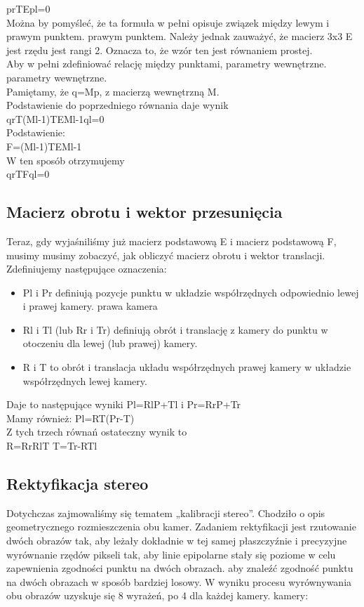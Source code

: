 \documentclass[magisterska]{pracadypl}
\begin{document}
prTEpl=0\\
Można by pomyśleć, że ta formuła w pełni opisuje związek między lewym i prawym punktem.
prawym punktem. Należy jednak zauważyć, że macierz 3x3 E jest rzędu
jest rangi 2. Oznacza to, że wzór ten jest równaniem prostej.\\
Aby w pełni zdefiniować relację między punktami, parametry wewnętrzne.
parametry wewnętrzne.\\
Pamiętamy, że q=Mp, z macierzą wewnętrzną M.\\
Podstawienie do poprzedniego równania daje wynik\\
qrT(Ml-1)TEMl-1ql=0\\
Podstawienie:\\
F=(Ml-1)TEMl-1\\
W ten sposób otrzymujemy\\
qrTFql=0\\

\subsection{Macierz obrotu i wektor przesunięcia}

Teraz, gdy wyjaśniliśmy już macierz podstawową E i macierz podstawową F, musimy
musimy zobaczyć, jak obliczyć macierz obrotu i wektor translacji.
Zdefiniujemy następujące oznaczenia:

\begin{itemize}
  \item Pl i Pr definiują pozycje punktu w układzie współrzędnych odpowiednio lewej i prawej kamery.
prawa kamera
  \item Rl i Tl (lub Rr i Tr) definiują obrót i translację z kamery
do punktu w otoczeniu dla lewej (lub prawej) kamery.
  \item R i T to obrót i translacja układu współrzędnych prawej kamery w układzie współrzędnych lewej kamery.
\end{itemize}

Daje to następujące wyniki
Pl=RlP+Tl i Pr=RrP+Tr\\
Mamy również:
Pl=RT(Pr-T)\\
Z tych trzech równań ostateczny wynik to\\
R=RrRlT
T=Tr-RTl

\subsection{Rektyfikacja stereo}

Dotychczas zajmowaliśmy się tematem „kalibracji stereo”. Chodziło o
opis geometrycznego rozmieszczenia obu kamer. Zadaniem
rektyfikacji jest rzutowanie dwóch obrazów tak, aby leżały dokładnie w tej samej płaszczyźnie i precyzyjne wyrównanie rzędów pikseli tak, aby linie epipolarne stały się poziome w celu zapewnienia zgodności punktu na dwóch obrazach.
aby znaleźć zgodność punktu na dwóch obrazach w sposób bardziej losowy.
W wyniku procesu wyrównywania obu obrazów uzyskuje się 8 wyrażeń, po 4 dla każdej kamery.
kamery:
\end{document}
